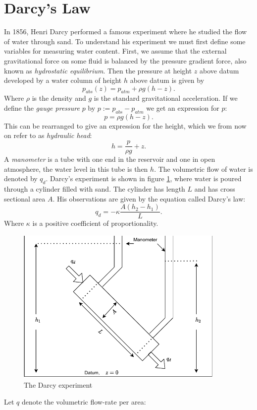 \documentclass[../Main/main.tex]{subfiles}
\begin{document}
\section{Darcy's Law}
In 1856, Henri Darcy performed a famous experiment where he studied the flow of water through sand. To understand his experiment we must first define some variables for measuring water content. First, we assume that the external gravitational force on some fluid is balanced by the pressure gradient force, also known as \emph{hydrostatic equilibrium}. Then the pressure at height $z$ above datum developed by a water column of height $h$ above datum is given by
\begin{equation*}
p_{abs}(z) = p_{atm} + \rho g(h-z).
\end{equation*}
Where $\rho$ is the density and $g$ is the standard gravitational acceleration.
If we define the \emph{gauge pressure} $p$ by $p := p_{abs}-p_{atm}$ we get an expression for $p$:
\begin{equation*}
p = \rho g(h-z).
\end{equation*}
This can be rearranged to give an expression for the height, which we from now on refer to as \emph{hydraulic head}:
\begin{equation}\label{eq:hydraulic}
h = \frac{p}{\rho g} + z.
\end{equation}
A \emph{manometer} is a tube with one end in the reservoir and one in open atmosphere, the water level in this tube is then $h$. The volumetric flow of water is denoted by $q_d$. Darcy's experiment is shown in figure \ref{fig:darcy}, where water is poured through a cylinder filled with sand. The cylinder has length $L$ and has cross sectional area $A$. His observations are given by the equation called Darcy's law:
\begin{equation}
q_d = -\kappa \frac{A(h_2-h_1)}{L}.
\end{equation}
Where $\kappa$ is a positive coefficient of proportionality.
\begin{figure}[h]
\centering
\includegraphics[width=0.9\textwidth]{Darcy experiment.pdf}
\caption{The Darcy experiment}
\label{fig:darcy}
\end{figure}Let $q$ denote the volumetric flow-rate per area:
\end{document}
